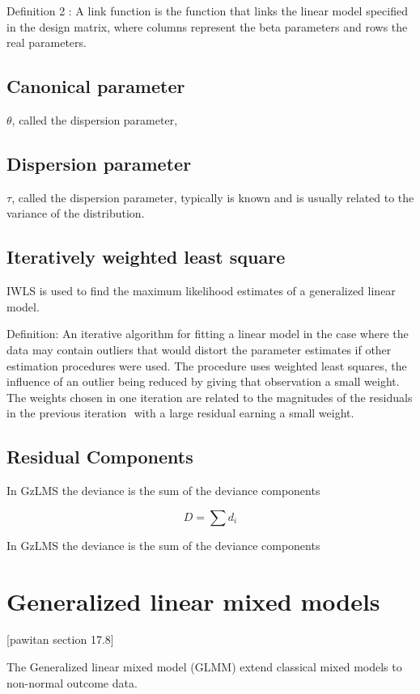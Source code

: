 \documentclass[Main.tex]{subfiles}
\begin{document}
	\noindent Definition 2 : A link function is the function that
	links the linear model specified in the design matrix, where
	columns represent the beta parameters and rows the real
	parameters.
	
	\subsection{Canonical parameter}
	$\theta$, called the dispersion parameter,
	\subsection{Dispersion parameter}
	$\tau$, called the dispersion parameter, typically is known and is
	usually related to the variance of the distribution.
	
	\subsection{Iteratively weighted least square}
	IWLS is used to find the maximum likelihood estimates of a
	generalized linear model.
	
	\noindent Definition: An iterative algorithm for fitting a linear
	model in the case where the data may contain outliers that would
	distort the parameter estimates if other estimation procedures
	were used. The procedure uses weighted least squares, the
	influence of an outlier being reduced by giving that observation a
	small weight. The weights chosen in one iteration are related to
	the magnitudes of the residuals in the previous iteration  with a
	large residual earning a small weight.
	
	\subsection{Residual Components}
	In GzLMS the deviance is the sum of the deviance components
	
	\begin{equation}
	D = \sum d_{i}
	\end{equation}
	
	In GzLMS the deviance is the sum of the deviance components
	
	
	\section{Generalized linear mixed models}
	[pawitan section 17.8]
	
	The Generalized linear mixed model (GLMM) extend classical mixed models to non-normal outcome data.
	
\end{document}
